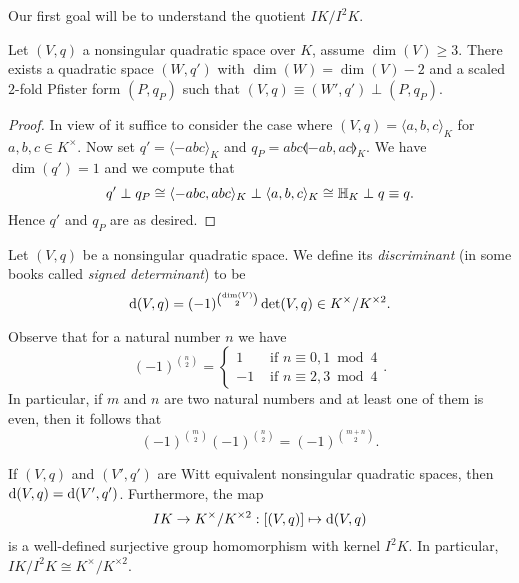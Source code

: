 \documentclass[12pt, leqno, british]{amsart}
\begin{document}
Our first goal will be to understand the quotient $I K/I^2K$.
\begin{lem}\label{L:split-off-2fold-Pfister}
Let $(V, q)$ a nonsingular quadratic space over $K$, assume $\dim(V) \geq 3$.
There exists a quadratic space $(W, q')$ with $\dim(W) = \dim(V) - 2$ and a scaled $2$-fold Pfister form $(P, q_P)$ such that $(V, q) \equiv (W', q') \perp (P, q_P)$.
\end{lem}
\begin{proof}
In view of  it suffice to consider the case where $(V, q) = \langle a, b, c \rangle_K$ for $a, b, c \in K^\times$.
Now set $q' = \langle -abc \rangle_K$ and $q_P = abc\llangle -ab, ac \rrangle_K$.
We have $\dim(q') = 1$ and we compute that
$$q' \perp q_P \cong \langle -abc , abc \rangle_K \perp \langle a, b, c \rangle_K \cong \mathbb{H}_K \perp q \equiv q.$$
Hence $q'$ and $q_P$ are as desired.
\end{proof}
\begin{defi}
Let $(V, q)$ be a nonsingular quadratic space.
We define its \emph{discriminant} (in some books called \emph{signed determinant}) to be
$$ \mathrm{d}(V, q) = (-1)^{\binom{\dim(V)}{2}} \det(V, q) \in K^\times/K^{\times 2}.$$
\end{defi}
Observe that for a natural number $n$ we have
\begin{equation*}\label{E:binom}
(-1)^{\binom{n}{2}} = \begin{cases}
1 &\text{ if } n \equiv 0, 1 \bmod 4 \\
-1 &\text{ if } n \equiv 2, 3 \bmod 4
\end{cases}.
\end{equation*}
In particular, if $m$ and $n$ are two natural numbers and at least one of them is even, then it follows that
\begin{equation}\label{E:binom2}
(-1)^{\binom{m}{2}}(-1)^{\binom{n}{2}} = (-1)^{\binom{m+n}{2}}.
\end{equation}
\begin{prop}\label{P:disc-map}
If $(V, q)$ and $(V', q')$ are Witt equivalent nonsingular quadratic spaces, then $\mathrm{d}(V, q) = \mathrm{d}(V', q')$.
Furthermore, the map
$$ IK \to K^\times/K^{\times 2} : [(V, q)] \mapsto \mathrm{d}(V, q) $$
is a well-defined surjective group homomorphism with kernel $I^2K$.
In particular, $IK/I^2K \cong K^\times / K^{\times 2}$.
\end{prop}
\end{document}
